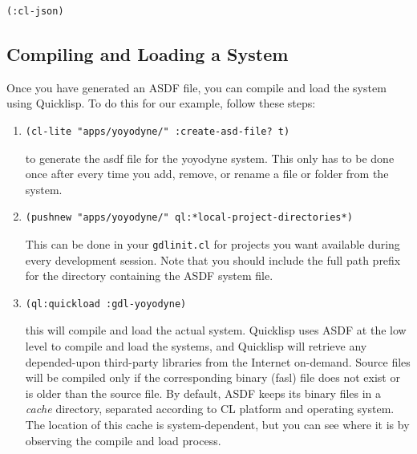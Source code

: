 \documentclass [11pt]{book}
\begin{document}
\begin{verbatim}(:cl-json)
\end{verbatim}



\subsection{Compiling and Loading a System}

\label{subsec:compilingandloadingasystem}

Once you have generated an ASDF file, you can compile and
load the system using Quicklisp. To do this for our example, follow these steps:

\begin{enumerate}

\item 

\begin{verbatim}(cl-lite "apps/yoyodyne/" :create-asd-file? t)
\end{verbatim} to generate the asdf file for the yoyodyne system. This only has to be done once after every time you add, remove, or rename a file or folder from the system.

\item 

\begin{verbatim}(pushnew "apps/yoyodyne/" ql:*local-project-directories*)
\end{verbatim} This can be done in your \texttt{gdlinit.cl} for projects you want available during every development session. Note that you should include
the full path prefix for the directory containing the ASDF system file.

\item 

\begin{verbatim}(ql:quickload :gdl-yoyodyne)
\end{verbatim} this will compile and load the actual system. Quicklisp
uses ASDF at the low level to compile and load the systems, and
Quicklisp will retrieve any depended-upon third-party libraries from
the Internet on-demand.  Source files will be compiled only if the
corresponding binary (fasl) file does not exist or is older than the
source file. By default, ASDF keeps its binary files in a  \emph{cache} directory, separated according to CL platform and
operating system. The location of this cache is system-dependent, but
you can see where it is by observing the compile and load
process.

\end{enumerate}
\end{document}
